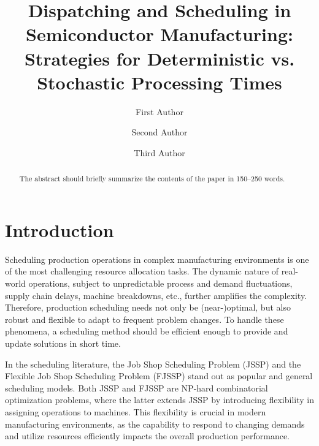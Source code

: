 \documentclass[runningheads]{llncs}
\begin{document}
%
\title{%
	Dispatching and Scheduling in Semiconductor Manufacturing: Strategies for Deterministic vs. Stochastic Processing Times
}
%
%
\author{First Author \and
Second Author \and
Third Author}
%
%
%
\maketitle              %
%
\begin{abstract}
The abstract should briefly summarize the contents of the paper in
150--250 words.

\end{abstract}
%
%
%
\section{Introduction}
\label{sec:introduction}
Scheduling production operations in complex manufacturing environments
is one of the most challenging resource allocation tasks. The dynamic nature of real-world operations, subject to unpredictable process and demand fluctuations, supply chain delays, machine breakdowns, etc., further amplifies the complexity.
Therefore, production scheduling needs not only be (near-)optimal, but also robust and flexible to adapt to frequent problem changes.
To handle these phenomena, a scheduling method should be efficient enough to provide and update solutions in short time.      

In the scheduling literature, the Job Shop Scheduling Problem (JSSP) \cite{xiong2022survey} and the Flexible Job Shop Scheduling Problem (FJSSP) \cite{xie2019review} stand out as popular and general scheduling models.
Both JSSP and FJSSP are NP-hard combinatorial optimization problems, where the latter extends JSSP by introducing flexibility in assigning operations to machines. This flexibility is crucial in modern manufacturing environments, as the capability to respond to changing demands and utilize resources efficiently impacts the overall production performance.  
\end{document}
